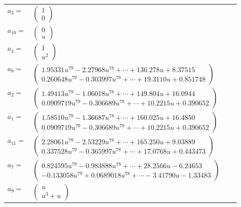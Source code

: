 \documentclass[1p]{elsarticle_modified}
\theoremstyle{definition}
\begin{document}
\begin{tabular}{m{7pt} m{180pt} m{7pt} m{180pt} }
\flushright $a_{3}=$&$\begin{pmatrix}1\\0\end{pmatrix}$ \\
\flushright $a_{10}=$&$\begin{pmatrix}0\\u\end{pmatrix}$ \\
\flushright $a_{4}=$&$\begin{pmatrix}1\\u^2\end{pmatrix}$ \\
\flushright $a_{8}=$&$\begin{pmatrix}1.95331 u^{79}-2.27968 u^{78}+\cdots+136.278 u+8.37515\\0.260648 u^{79}-0.303997 u^{78}+\cdots+19.3110 u+0.851748\end{pmatrix}$ \\
\flushright $a_{2}=$&$\begin{pmatrix}1.49413 u^{79}-1.06018 u^{78}+\cdots+149.804 u+16.0944\\0.0909719 u^{79}-0.306689 u^{78}+\cdots+10.2215 u+0.390652\end{pmatrix}$ \\
\flushright $a_{1}=$&$\begin{pmatrix}1.58510 u^{79}-1.36687 u^{78}+\cdots+160.025 u+16.4850\\0.0909719 u^{79}-0.306689 u^{78}+\cdots+10.2215 u+0.390652\end{pmatrix}$ \\
\flushright $a_{11}=$&$\begin{pmatrix}2.28061 u^{79}-2.53229 u^{78}+\cdots+165.250 u+9.03889\\0.337528 u^{79}-0.365997 u^{78}+\cdots+17.0768 u+0.443473\end{pmatrix}$ \\
\flushright $a_{7}=$&$\begin{pmatrix}0.824595 u^{79}-0.983888 u^{78}+\cdots+28.2566 u-6.24653\\-0.133058 u^{79}+0.0689018 u^{78}+\cdots-3.41790 u-1.33483\end{pmatrix}$ \\
\flushright $a_{9}=$&$\begin{pmatrix}u\\u^3+u\end{pmatrix}$ \\

\end{tabular}
\end{document}
